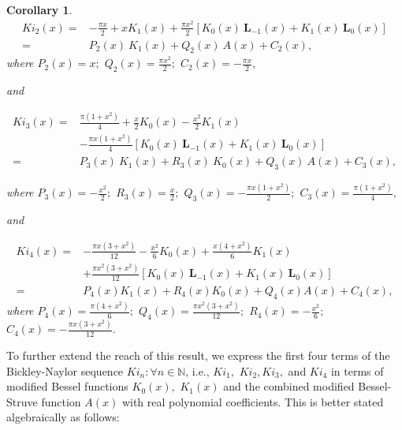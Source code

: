 \documentclass[pdflatex,sn-mathphys-num]{sn-jnl}%
\newtheorem{corollary}{Corollary}
\theoremstyle{thmstyleone}%
\theoremstyle{thmstyletwo}%
\theoremstyle{thmstylethree}%
\begin{document}
\begin{corollary}

\begin{equation} 
\begin{split}
Ki_2(x)
= & -\frac{\pi x}{2} + x K_1(x) + \frac{\pi x^2}{2} [ K_0(x) \:\pmb{L}_{-1}(x) + K_1(x) \:\pmb{L}_0 (x)]\\
= & P_2(x)\:K_1(x) + Q_2(x)\: A(x) + C_2(x),
\end{split}
\end{equation}
where $P_2(x)=x;$ $Q_2(x) = \frac{\pi x^2}{2};$ $C_2(x)= -\frac{\pi x}{2},$

and

\begin{equation} 
\begin{split}
Ki_3(x)
= & \frac{\pi (1+x^2)}{4} + \frac{x}{2} K_0(x)
- \frac{x^2}{2} K_1(x)\\
& - \frac{\pi x (1+x^2)}{4} [ K_0(x) \:\pmb{L}_{-1} (x)
+  K_1(x) \:\pmb{L}_0(x)] \\
= & P_3(x)\:K_1(x) + R_3(x)\: K_0(x) + Q_3(x) \:A(x) + C_3(x),
\end{split}
\end{equation}

where $P_3(x)=-\frac{x^2}{2};$ $R_3(x)=\frac{x}{2};$ $Q_3(x) =- \frac{\pi x (1+x^2)}{2};$ $C_3(x)= \frac{\pi(1+x^2)}{4},$

and

\begin{equation} 
\begin{split}
Ki_4(x)
= & -\frac{\pi x (3+x^2)}{12} - \frac{x^2} {6}K_0(x) + \frac{x (4+x^2)}{6} K_1(x) \\
& + \frac{\pi x^2 (3+x^2)}{12} 
[K_0(x) \:\pmb{L}_{-1} (x) + K_1(x) \:\pmb{L}_0 (x) ] \\
= & P_4(x) K_1(x) + R_4(x)  K_0(x) + Q_4(x)  A(x) + C_4(x),
\end{split}
\end{equation}
where $P_4(x)=\frac{\pi(4+x^2)}{6};$ $Q_4(x) = \frac{\pi x^2(3+x^2)}{12};$ $R_4(x)= -\frac{x^2}{6};$ $ C_4(x)=-\frac{\pi x (3+x^2)}{12}.$

\end{corollary}

To further extend the reach of this result, we express the first four terms of the Bickley-Naylor sequence $Ki_n: \forall n\in\mathbb{N}$, i.e., $Ki_1,$ $Ki_2, Ki_3,$ and $Ki_4$ in terms of modified Bessel functions $K_0(x),$ $K_1(x)$ and the combined modified Bessel-Struve function $A(x)$ with real polynomial coefficients. This is better stated algebraically as follows:
\end{document}
